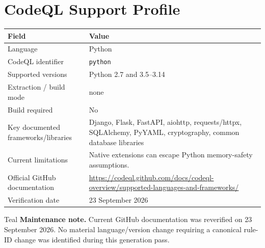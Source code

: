 \documentclass[10pt,letterpaper]{article}
\newcommand{\code}[1]{\texttt{\small #1}}
\begin{document}
\section{CodeQL Support Profile}
\begin{tabularx}{\textwidth}{@{}P{1.9in}Y@{}}
\toprule
\textbf{Field} & \textbf{Value}\\
\midrule
Language & Python\\
CodeQL identifier & \code{python}\\
Supported versions & Python 2.7 and 3.5--3.14\\
Extraction / build mode & none\\
Build required & No\\
Key documented frameworks/libraries & Django, Flask, FastAPI, aiohttp, requests/httpx, SQLAlchemy, PyYAML, cryptography, common database libraries\\
Current limitations & Native extensions can escape Python memory-safety assumptions.\\
Official GitHub documentation & \url{https://codeql.github.com/docs/codeql-overview/supported-languages-and-frameworks/}\\
Verification date & 23 September 2026\\
\bottomrule
\end{tabularx}
\begin{callout}{Teal}
\textbf{Maintenance note.} Current GitHub documentation was reverified on 23 September 2026. No material language/version change requiring a canonical rule-ID change was identified during this generation pass.
\end{callout}
\end{document}
